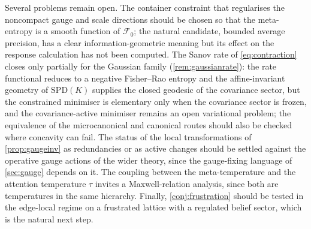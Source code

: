 \documentclass[11pt]{article}
\theoremstyle{plain}
\theoremstyle{definition}
\newcommand{\SPD}{\mathrm{SPD}}
\newcommand{\Fcal}{\mathcal{F}}
\begin{document}
Several problems remain open. The container constraint that regularises the noncompact
gauge and scale directions should be chosen so that the meta-entropy is a smooth function
of $\Fcal_0$; the natural candidate, bounded average precision, has a clear
information-geometric meaning but its effect on the response calculation has not been
computed. The Sanov rate of \cref{eq:contraction} closes only partially for the Gaussian
family (\cref{rem:gaussianrate}): the rate functional reduces to a negative Fisher--Rao
entropy and the affine-invariant geometry of $\SPD(K)$ supplies the closed geodesic of the
covariance sector, but the constrained minimiser is elementary only when the covariance
sector is frozen, and the covariance-active minimiser remains an open variational problem;
the equivalence of the microcanonical and canonical routes should also be checked where
concavity can fail. The status of the local transformations of
\cref{prop:gaugeinv} as redundancies or as active changes should be settled against the
operative gauge actions of the wider theory, since the gauge-fixing language of
\cref{sec:gauge} depends on it. The coupling between the meta-temperature and the
attention temperature $\tau$ invites a Maxwell-relation analysis, since both are
temperatures in the same hierarchy. Finally, \cref{conj:frustration} should be tested in
the edge-local regime on a frustrated lattice with a regulated belief sector, which is
the natural next step.
\end{document}
